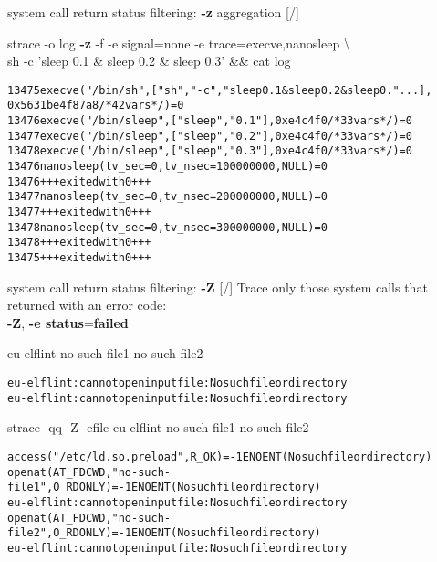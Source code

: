 \documentclass[unicode,aspectratio=169]{beamer}
\begin{document}
\begin{frame}[fragile]{system call return status filtering: \textbf{-z} aggregation \hfill [\insertframenumber/\inserttotalframenumber]}
\begin{block}{strace -o log \textbf{-z} -f -e signal=none -e trace=execve,nanosleep {\textbackslash} \\
	sh -c 'sleep 0.1 \& sleep 0.2 \& sleep 0.3' \&\& cat log}
\small
\begin{alltt}
13475 execve("/bin/sh", ["sh", "-c", "sleep 0.1 & sleep 0.2 & sleep 0."...],
      0x5631be4f87a8 /* 42 vars */) = 0
13476 execve("/bin/sleep", ["sleep", "0.1"], 0xe4c4f0 /* 33 vars */) = 0
13477 execve("/bin/sleep", ["sleep", "0.2"], 0xe4c4f0 /* 33 vars */) = 0
13478 execve("/bin/sleep", ["sleep", "0.3"], 0xe4c4f0 /* 33 vars */) = 0
13476 nanosleep({tv_sec=0, tv_nsec=100000000}, NULL) = 0
13476 +++ exited with 0 +++
13477 nanosleep({tv_sec=0, tv_nsec=200000000}, NULL) = 0
13477 +++ exited with 0 +++
13478 nanosleep({tv_sec=0, tv_nsec=300000000}, NULL) = 0
13478 +++ exited with 0 +++
13475 +++ exited with 0 +++
\end{alltt}
\end{block}
\end{frame}

\begin{frame}[fragile]{system call return status filtering: \textbf{-Z} \hfill [\insertframenumber/\inserttotalframenumber]}
\Large
Trace only those system calls that returned with an error code: \\
\textbf{-Z}, \textbf{-e status}=\textbf{failed}

\begin{block}{eu-elflint no-such-file1 no-such-file2}
\small
\begin{alltt}
eu-elflint: cannot open input file: No such file or directory
eu-elflint: cannot open input file: No such file or directory
\end{alltt}
\end{block}

\begin{block}{strace -qq -Z -efile eu-elflint no-such-file1 no-such-file2}
\small
\begin{alltt}
access("/etc/ld.so.preload", R_OK) = -1 ENOENT (No such file or directory)
openat(AT_FDCWD, "no-such-file1", O_RDONLY) = -1 ENOENT (No such file or directory)
eu-elflint: cannot open input file: No such file or directory
openat(AT_FDCWD, "no-such-file2", O_RDONLY) = -1 ENOENT (No such file or directory)
eu-elflint: cannot open input file: No such file or directory
\end{alltt}
\end{block}

\end{frame}
\end{document}
